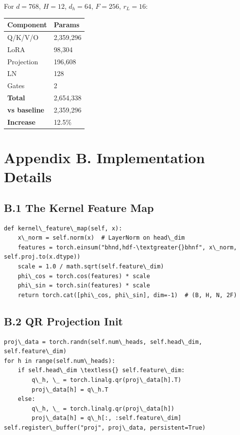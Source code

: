 For $d = 768$, $H = 12$, $d_h = 64$, $F = 256$, $r_L = 16$:

\begin{table}[H]
\centering
\small
\begin{tabular}{ll}
\toprule
\textbf{Component} & \textbf{Params} \\
\midrule
Q/K/V/O & 2,359,296 \\
LoRA & 98,304 \\
Projection & 196,608 \\
LN & 128 \\
Gates & 2 \\
\textbf{Total} & 2,654,338 \\
\textbf{vs baseline} & 2,359,296 \\
\textbf{Increase} & 12.5\% \\
\bottomrule
\end{tabular}
\end{table}



\section{Appendix B. Implementation Details}

\subsection{B.1 The Kernel Feature Map}

\begin{lstlisting}
def kernel\_feature\_map(self, x):
    x\_norm = self.norm(x)  # LayerNorm on head\_dim
    features = torch.einsum("bhnd,hdf-\textgreater{}bhnf", x\_norm, self.proj.to(x.dtype))
    scale = 1.0 / math.sqrt(self.feature\_dim)
    phi\_cos = torch.cos(features) * scale
    phi\_sin = torch.sin(features) * scale
    return torch.cat([phi\_cos, phi\_sin], dim=-1)  # (B, H, N, 2F)
\end{lstlisting}

\subsection{B.2 QR Projection Init}

\begin{lstlisting}
proj\_data = torch.randn(self.num\_heads, self.head\_dim, self.feature\_dim)
for h in range(self.num\_heads):
    if self.head\_dim \textless{} self.feature\_dim:
        q\_h, \_ = torch.linalg.qr(proj\_data[h].T)
        proj\_data[h] = q\_h.T
    else:
        q\_h, \_ = torch.linalg.qr(proj\_data[h])
        proj\_data[h] = q\_h[:, :self.feature\_dim]
self.register\_buffer("proj", proj\_data, persistent=True)
\end{lstlisting}


